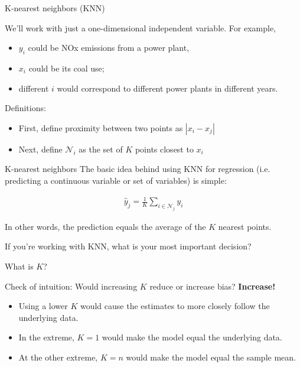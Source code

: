 \documentclass[aspectratio=169]{beamer}
\begin{document}
\begin{frame}{K-nearest neighbors (KNN)}

 We'll work with just a one-dimensional independent variable. For example, 
\begin{itemize}
\item $y_i$ could be NOx emissions from a power plant, 
\item $x_i$ could be its coal use; 
\item different $i$ would correspond to different power plants in different years.
\end{itemize}

\vspace{5mm}
Definitions:
\begin{itemize}
\item First, define proximity between two points as $|x_i-x_j|$
\item Next, define $\mathcal{N}_i$ as the set of $K$ points closest to $x_i$ 
\end{itemize}

\end{frame}

\begin{frame}{K-nearest neighbors}
The basic idea behind using KNN for regression (i.e. predicting a continuous variable or set of variables) is simple:

\begin{align*}
\hat{y}_j = \frac{1}{K} \sum_{i\in \mathcal{N}_j} y_i
\end{align*}

In other words, the prediction equals the average of the $K$ nearest points.
\end{frame}

\begin{frame}{If you're working with KNN, what is your most important decision?}

\pause

\begin{center}
What is $K$?
\end{center}

Check of intuition:  Would increasing $K$ reduce or increase bias?\pause \textbf{  Increase!}

\begin{itemize}
\item Using a lower $K$ would cause the estimates to more closely follow the underlying data.  
\item In the extreme, $K=1$ would make the model equal the underlying data.
\item At the other extreme, $K=n$ would make the model equal the sample mean.
\end{itemize}
\end{frame}
\end{document}
